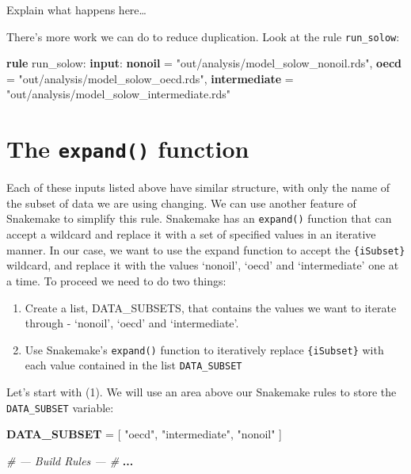 \documentclass[]{book}
\newenvironment{Shaded}{\begin{snugshade}}{\end{snugshade}}
\newcommand{\KeywordTok}[1]{\textcolor[rgb]{0.13,0.29,0.53}{\textbf{{#1}}}}
\newcommand{\StringTok}[1]{\textcolor[rgb]{0.31,0.60,0.02}{{#1}}}
\newcommand{\CommentTok}[1]{\textcolor[rgb]{0.56,0.35,0.01}{\textit{{#1}}}}
\newcommand{\NormalTok}[1]{{#1}}
\providecommand{\tightlist}{%
  \setlength{\itemsep}{0pt}\setlength{\parskip}{0pt}}
\theoremstyle{definition}
\theoremstyle{definition}
\theoremstyle{definition}
\theoremstyle{remark}
\begin{document}
Explain what happens here\ldots{}

There's more work we can do to reduce duplication. Look at the rule
\texttt{run\_solow}:

\begin{Shaded}
\begin{Highlighting}[]
\KeywordTok{rule} \NormalTok{run_solow:}
    \KeywordTok{input}\NormalTok{:}
        \KeywordTok{nonoil} \NormalTok{= }\StringTok{"out/analysis/model_solow_nonoil.rds"}\NormalTok{,}
        \KeywordTok{oecd}   \NormalTok{= }\StringTok{"out/analysis/model_solow_oecd.rds"}\NormalTok{,}
        \KeywordTok{intermediate} \NormalTok{= }\StringTok{"out/analysis/model_solow_intermediate.rds"}
\end{Highlighting}
\end{Shaded}

\section{\texorpdfstring{The \texttt{expand()}
function}{The expand() function}}\label{the-expand-function}

Each of these inputs listed above have similar structure, with only the
name of the subset of data we are using changing. We can use another
feature of Snakemake to simplify this rule. Snakemake has an
\texttt{expand()} function that can accept a wildcard and replace it
with a set of specified values in an iterative manner. In our case, we
want to use the expand function to accept the \texttt{\{iSubset\}}
wildcard, and replace it with the values `nonoil', `oecd' and
`intermediate' one at a time. To proceed we need to do two things:

\begin{enumerate}
\def\labelenumi{\arabic{enumi}.}
\tightlist
\item
  Create a list, DATA\_SUBSETS, that contains the values we want to
  iterate through - `nonoil', `oecd' and `intermediate'.
\item
  Use Snakemake's \texttt{expand()} function to iteratively replace
  \texttt{\{iSubset\}} with each value contained in the list
  \texttt{DATA\_SUBSET}
\end{enumerate}

Let's start with (1). We will use an area above our Snakemake rules to
store the \texttt{DATA\_SUBSET} variable:

\begin{Shaded}
\begin{Highlighting}[]
\KeywordTok{DATA_SUBSET} \NormalTok{= [}
                \StringTok{"oecd"}\NormalTok{,}
                \StringTok{"intermediate"}\NormalTok{,}
                \StringTok{"nonoil"}
                \NormalTok{]}

\CommentTok{# --- Build Rules --- #}
\KeywordTok{...}
\end{Highlighting}
\end{Shaded}
\end{document}
